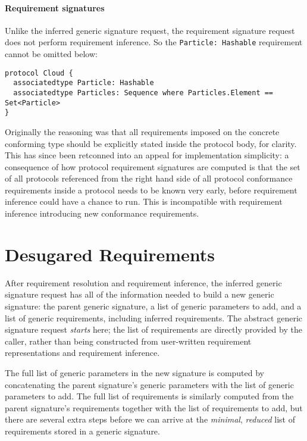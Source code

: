 \documentclass[a4paper,headsepline,bibliography=totoc,toc=flat,fleqn,twoside=semi]{scrbook}
\theoremstyle{definition}
\theoremstyle{definition}
\theoremstyle{definition}
\newcommand{\ifWIP}{\iffalse}
\begin{document}
\paragraph{Requirement signatures}
Unlike the inferred generic signature request, the requirement signature request does not perform requirement inference. So the \texttt{Particle:\ Hashable} requirement cannot be omitted below:
\begin{Verbatim}
protocol Cloud {
  associatedtype Particle: Hashable
  associatedtype Particles: Sequence where Particles.Element == Set<Particle>
}
\end{Verbatim}
Originally the reasoning was that all requirements imposed on the concrete conforming type should be explicitly stated inside the protocol body, for clarity. This has since been retconned into an appeal for implementation simplicity: a consequence of how protocol requirement signatures are computed is that the set of all protocols referenced from the right hand side of all protocol conformance requirements inside a protocol needs to be known very early, before requirement inference could have a chance to run. This is incompatible with requirement inference introducing new conformance requirements.
\fi

\section{Desugared Requirements}\label{requirement desugaring}

\ifWIP
After requirement resolution and requirement inference, the inferred generic signature request has all of the information needed to build a new generic signature: the parent generic signature, a list of generic parameters to add, and a list of generic requirements, including inferred requirements. The abstract generic signature request \emph{starts} here; the list of requirements are directly provided by the caller, rather than being constructed from user-written requirement representations and requirement inference.

The full list of generic parameters in the new signature is computed by concatenating the parent signature's generic parameters with the list of generic parameters to add. The full list of requirements is similarly computed from the parent signature's requirements together with the list of requirements to add, but there are several extra steps before we can arrive at the \emph{minimal}, \emph{reduced} list of requirements stored in a generic signature.
\end{document}
